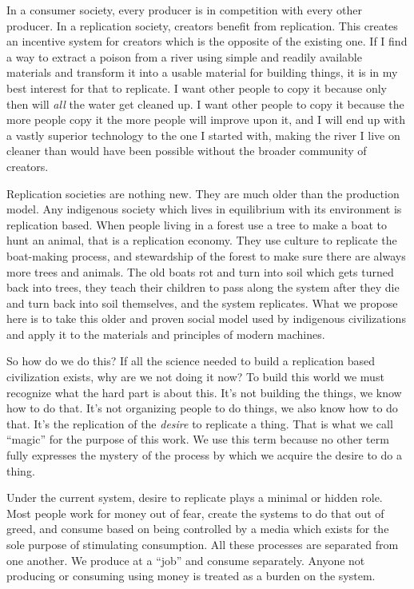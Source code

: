 In a consumer society, every producer is in competition with every other
producer. In a replication society, creators benefit from replication.
This creates an incentive system for creators which is the opposite of
the existing one. If I find a way to extract a poison from a river using
simple and readily available materials and transform it into a usable
material for building things, it is in my best interest for that to
replicate. I want other people to copy it because only then will
\emph{all} the water get cleaned up. I want other people to copy it
because the more people copy it the more people will improve upon it,
and I will end up with a vastly superior technology to the one I started
with, making the river I live on cleaner than would have been possible
without the broader community of creators.

Replication societies are nothing new. They are much older than the
production model. Any indigenous society which lives in equilibrium with
its environment is replication based. When people living in a forest use
a tree to make a boat to hunt an animal, that is a replication economy.
They use culture to replicate the boat-making process, and stewardship
of the forest to make sure there are always more trees and animals. The
old boats rot and turn into soil which gets turned back into trees, they
teach their children to pass along the system after they die and turn
back into soil themselves, and the system replicates. What we propose
here is to take this older and proven social model used by indigenous
civilizations and apply it to the materials and principles of modern
machines.

So how do we do this? If all the science needed to build a replication
based civilization exists, why are we not doing it now? To build this
world we must recognize what the hard part is about this. It's not
building the things, we know how to do that. It's not organizing people
to do things, we also know how to do that. It's the replication of the
\emph{desire} to replicate a thing. That is what we call ``magic'' for
the purpose of this work. We use this term because no other term fully
expresses the mystery of the process by which we acquire the desire to
do a thing.

Under the current system, desire to replicate plays a minimal or hidden
role. Most people work for money out of fear, create the systems to do
that out of greed, and consume based on being controlled by a media
which exists for the sole purpose of stimulating consumption. All these
processes are separated from one another. We produce at a ``job'' and
consume separately. Anyone not producing or consuming using money is
treated as a burden on the system.

